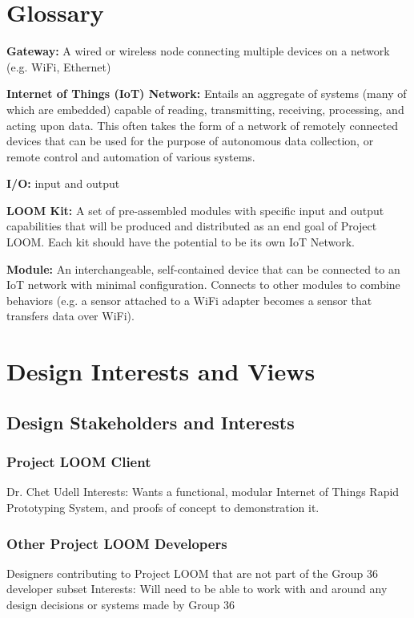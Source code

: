 \documentclass[onecolumn, draftclsnofoot,10pt, compsoc]{IEEEtran}
\begin{document}
\section{Glossary}
    \textbf{Gateway:} A wired or wireless node connecting multiple devices on a network (e.g. WiFi, Ethernet)

    \textbf{Internet of Things (IoT) Network:} Entails an aggregate of systems (many of which are embedded) capable of reading, transmitting, receiving, processing, and acting upon data. This often takes the form of a network of remotely connected devices that can be used for the purpose of autonomous data collection, or remote control and automation of various systems.

    \textbf{I/O:} input and output

    \textbf{LOOM Kit:} A set of pre-assembled modules with specific input and output capabilities that will be produced and distributed as an end goal of Project LOOM. Each kit should have the potential to be its own IoT Network. 

    \textbf{Module:} An interchangeable, self-contained device that can be connected to an IoT network with minimal configuration. Connects to other modules to combine behaviors (e.g. a sensor attached to a WiFi adapter becomes a sensor that transfers data over WiFi).




\section{Design Interests and Views}
\subsection{Design Stakeholders and Interests}

\subsubsection{Project LOOM Client}
    Dr. Chet Udell
    Interests: Wants a functional, modular Internet of Things Rapid Prototyping System, and proofs of concept to demonstration it.

\subsubsection{Other Project LOOM Developers}
    Designers contributing to Project LOOM that are not part of the Group 36 developer subset
    Interests: Will need to be able to work with and around any design decisions or systems made by Group 36
\end{document}
